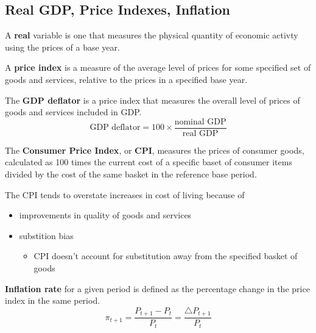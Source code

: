\subsection{Real GDP, Price Indexes, Inflation}

\begin{definition}
    A \textbf{real} variable is one that measures the physical quantity of economic activty using the prices of a base year. 
\end{definition}

\begin{definition}
    A \textbf{price index} is a measure of the average level of prices for some specified set of goods and services, relative to the prices in a specified base year. 
\end{definition}

\begin{definition}
    The \textbf{GDP deflator} is a price index that measures the overall level of prices of goods and services included in GDP. 
    \[
        \text{GDP deflator} = 100 \times \frac{ \text{nominal GDP}}{ \text{real GDP}}
    \]
\end{definition}

\begin{definition}
    The \textbf{Consumer Price Index}, or \textbf{CPI}, measures the prices of consumer goods, calculated as 100 times the current cost of a specific baset of consumer items divided by the cost of the same basket in the reference base period.
\end{definition}

\begin{remark}
    The CPI tends to overstate increases in cost of living because of
    \begin{itemize}
        \item improvements in quality of goods and services
        \item substition bias
        \begin{itemize}
            \item CPI doesn't account for substitution away from the specified basket of goods
        \end{itemize} 
    \end{itemize} 
\end{remark}

\begin{definition}
    \textbf{Inflation rate} for a given period is defined as the percentage change in the price index in the same period.
    \[
        \pi_{t + 1} = \frac{P_{t + 1} - P_t}{P_t} = \frac{\triangle P_{t+1}}{P_t}
    \]
\end{definition}

